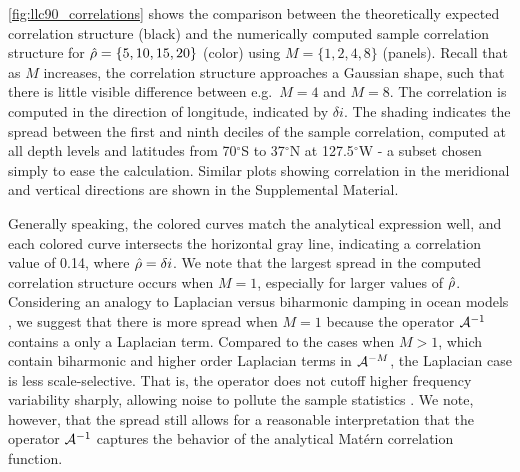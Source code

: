 \cref{fig:llc90_correlations} shows the comparison between the theoretically
expected correlation structure (black) and the numerically computed sample
correlation structure for
$\hat{\rho} = \{5, 10, 15, 20\}$ (color) using $M =\{1,2,4,8\}$ (panels).
Recall that as $M$ increases, the correlation structure approaches a Gaussian
shape, such that there is little visible difference between e.g.\ $M=4$ and
$M=8$.
The correlation is computed in the direction of longitude, indicated by
$\delta i$.
The shading indicates the spread between the first and ninth deciles of the
sample correlation, computed at all depth levels and latitudes from
70$^\circ$S to 37$^\circ$N at 127.5$^\circ$W - a subset chosen simply to ease the
calculation.
Similar plots showing correlation in the meridional and vertical directions are
shown in the Supplemental Material.

Generally speaking, the colored curves match the analytical expression well, and
each colored curve intersects the horizontal gray line, indicating a correlation
value of 0.14, where $\hat{\rho} = \delta i$.
We note that the largest spread in the computed correlation structure occurs
when $M=1$, especially for larger values of $\hat{\rho}$.
Considering an analogy to Laplacian versus biharmonic damping in ocean models
\citep[e.g.][]{holland_role_1978,griffies_biharmonic_2000}, we suggest that
there is more spread when $M=1$ because the operator $\mathcal{A}^{-1}$
contains a only a Laplacian term.
Compared to the cases when $M>1$, which contain biharmonic and higher order
Laplacian terms in $\mathcal{A}^{-M}$, the Laplacian case is less
scale-selective.
That is, the operator does not cutoff higher frequency variability sharply,
allowing noise to pollute the sample statistics \citep[see][Section 2 for a quantitative
description of this cutoff in frequency space]{griffies_biharmonic_2000}.
We note, however, that the spread still allows for a reasonable interpretation
that the operator $\mathcal{A}^{-1}$ captures the behavior of the analytical Mat\'ern correlation
function.

